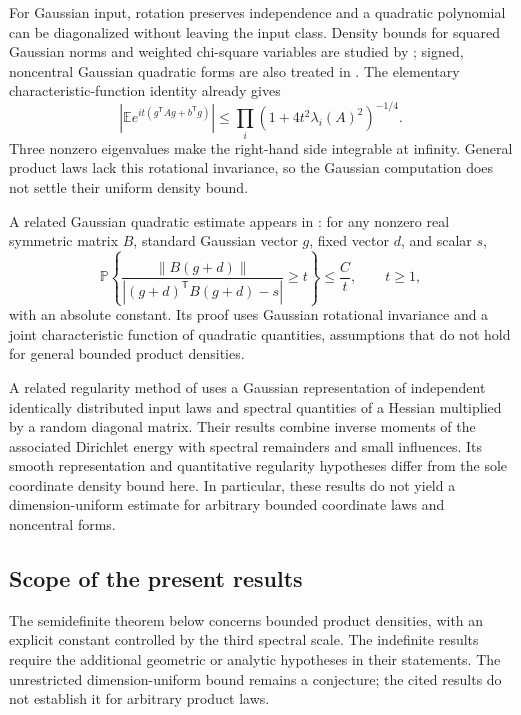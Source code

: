 For Gaussian input, rotation preserves independence and a quadratic polynomial can be diagonalized without leaving the input class. Density bounds for squared Gaussian norms and weighted chi-square variables are studied by \citet{GNSU2019,BNU2020}; signed, noncentral Gaussian quadratic forms are also treated in \citet{CK2026}. The elementary characteristic-function identity already gives
\[
 |\mathbb E e^{it(g^{\mathsf T}Ag+b^{\mathsf T}g)}|
 \leq\prod_i(1+4t^2\lambda_i(A)^2)^{-1/4}.
\]
Three nonzero eigenvalues make the right-hand side integrable at infinity. General product laws lack this rotational invariance, so the Gaussian computation does not settle their uniform density bound.

A related Gaussian quadratic estimate appears in \citet[Lemma~2.1]{APSSS2017}: for any nonzero real symmetric matrix $B$, standard Gaussian vector $g$, fixed vector $d$, and scalar $s$,
\[
 \mathbb P\!\left\{
 \frac{\|B(g+d)\|}{|(g+d)^{\mathsf T}B(g+d)-s|}\geq t
 \right\}\leq\frac{C}{t},\qquad t\geq1,
\]
with an absolute constant. Its proof uses Gaussian rotational invariance and a joint characteristic function of quadratic quantities, assumptions that do not hold for general bounded product densities.

A related regularity method of \citet{HMP2025} uses a Gaussian
representation of independent identically distributed input laws and
spectral quantities of a Hessian multiplied by a random diagonal
matrix.  Their results combine inverse moments of the associated
Dirichlet energy with spectral remainders and small influences.
Its smooth representation and quantitative regularity hypotheses
differ from the sole coordinate density bound here.  In particular,
these results do not yield a dimension-uniform estimate for arbitrary
bounded coordinate laws and noncentral forms.

\subsection{Scope of the present results}

The semidefinite theorem below concerns bounded product densities, with an explicit constant controlled by the third spectral scale. The indefinite results require the additional geometric or analytic hypotheses in their statements. The unrestricted dimension-uniform bound remains a conjecture; the cited results do not establish it for arbitrary product laws.
